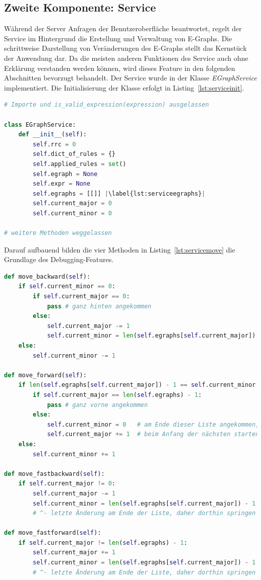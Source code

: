\subsection{Zweite Komponente: Service}

Während der Server Anfragen der Benutzeroberfläche beantwortet, regelt der Service im Hintergrund die Erstellung und Verwaltung von E-Graphs.
Die schrittweise Darstellung von Veränderungen des E-Graphs stellt das Kernstück der Anwendung dar. 
Da die meisten anderen Funktionen des Service auch ohne Erklärung verstanden werden können, wird dieses Feature in den folgenden Abschnitten bevorzugt behandelt.
Der Service wurde in der Klasse \textit{EGraphService} implementiert. Die Initialisierung der Klasse erfolgt in Listing~\ref{lst:serviceinit}.

\begin{lstlisting}[language=Python, escapechar=|, caption=Auszug aus der Datei \textit{EGraphService.py}, label={lst:serviceinit}]
# Importe und is_valid_expression(expression) ausgelassen 

class EGraphService:
    def __init__(self):
        self.rrc = 0
        self.dict_of_rules = {}
        self.applied_rules = set()
        self.egraph = None
        self.expr = None
        self.egraphs = [[]] |\label{lst:serviceegraphs}|
        self.current_major = 0
        self.current_minor = 0

# weitere Methoden weggelassen
\end{lstlisting} 

Darauf aufbauend bilden die vier Methoden in Listing~\ref{lst:servicemove} die Grundlage des Debugging-Features.

\begin{lstlisting}[language=Python, escapechar=|, caption=Methoden für das Debugging aus der Datei \textit{EGraphService.py}, label={lst:servicemove}]
def move_backward(self):
    if self.current_minor == 0:
        if self.current_major == 0:
            pass # ganz hinten angekommen
        else:
            self.current_major -= 1
            self.current_minor = len(self.egraphs[self.current_major]) - 1
    else:
        self.current_minor -= 1

def move_forward(self):
    if len(self.egraphs[self.current_major]) - 1 == self.current_minor:
        if self.current_major == len(self.egraphs) - 1:
            pass # ganz vorne angekommen
        else:
            self.current_minor = 0   # am Ende dieser Liste angekommen,
            self.current_major += 1  # beim Anfang der nächsten starten
    else:
        self.current_minor += 1

def move_fastbackward(self):
    if self.current_major != 0:
        self.current_major -= 1
        self.current_minor = len(self.egraphs[self.current_major]) - 1
        # ^- letzte Änderung am Ende der Liste, daher dorthin springen

def move_fastforward(self):
    if self.current_major != len(self.egraphs) - 1:
        self.current_major += 1
        self.current_minor = len(self.egraphs[self.current_major]) - 1
        # ^- letzte Änderung am Ende der Liste, daher dorthin springen
\end{lstlisting} 

